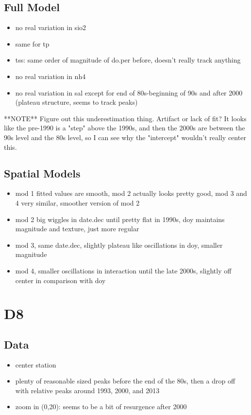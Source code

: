 \documentclass[12pt]{amsart}
\begin{document}
\subsection{Full Model}
\begin{itemize}
\item no real variation in sio2
\item same for tp
\item tss: same order of magnitude of do.per before, doesn't really track anything
\item no real variation in nh4
\item no real variation in sal except for end of 80s-beginning of 90s and after 2000 (plateau structure, seems to track peaks)
\end{itemize}
**NOTE** Figure out this underestimation thing. Artifact or lack of fit?
It looks like the pre-1990 is a "step" above the 1990s, and then the 2000s are between the 90s level and the 80s level, so I can see why the "intercept" wouldn't really center this.

\subsection{Spatial Models}

\begin{itemize}
\item mod 1 fitted values are smooth, mod 2 actually looks pretty good, mod 3 and 4 very similar, smoother version of mod 2
\item mod 2 big wiggles in date.dec until pretty flat in 1990s, doy maintains magnitude and texture, just more regular
\item mod 3, same date.dec,  slightly plateau like oscillations in doy, smaller magnitude
\item mod 4, smaller oscillations in interaction until the late 2000s, slightly off center in comparison with doy
\end{itemize}



\section{D8}
\subsection{Data}
\begin{itemize}
\item center station
\item plenty of reasonable sized peaks before the end of the 80s, then a drop off with relative peaks around 1993, 2000, and 2013
\item zoom in (0,20): seems to be a bit of resurgence after 2000
\end{itemize}
\end{document}
